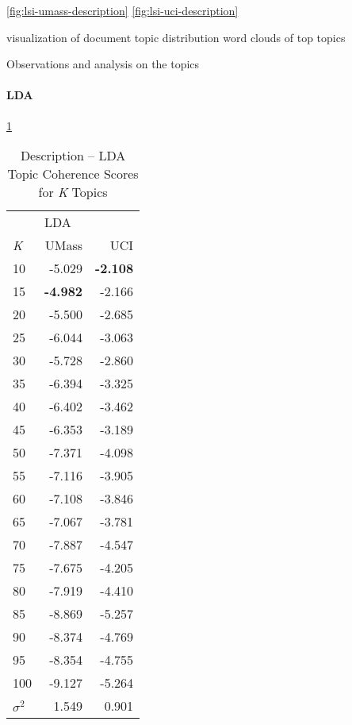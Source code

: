 \documentclass[letterpaper,12pt]{article}
\begin{document}
\ref{fig:lsi-umass-description}
\ref{fig:lsi-uci-description}


\newpage
visualization of document topic distribution
word clouds of top topics

Observations and analysis on the topics

\paragraph{LDA}

\ref{tab:lda_description_tc}
\begin{table}
	\caption{\label{tab:lda_description_tc} Description -- LDA Topic Coherence Scores for \emph{K} Topics}
	\begin{center}
		\begin{tabular}{lrr}
			\toprule
			{} & \multicolumn{2}{l}{LDA} \\
			\emph{K} &  UMass &    UCI \\
			\midrule
			10  & -5.029 & \textbf{-2.108} \\
			15  & \textbf{-4.982} & -2.166 \\
			20  & -5.500 & -2.685 \\
			25  & -6.044 & -3.063 \\
			30  & -5.728 & -2.860 \\
			35  & -6.394 & -3.325 \\
			40  & -6.402 & -3.462 \\
			45  & -6.353 & -3.189 \\
			50  & -7.371 & -4.098 \\
			55  & -7.116 & -3.905 \\
			60  & -7.108 & -3.846 \\
			65  & -7.067 & -3.781 \\
			70  & -7.887 & -4.547 \\
			75  & -7.675 & -4.205 \\
			80  & -7.919 & -4.410 \\
			85  & -8.869 & -5.257 \\
			90  & -8.374 & -4.769 \\
			95  & -8.354 & -4.755 \\
			100 & -9.127 & -5.264 \\
			\midrule
			$\sigma^2$ & 1.549 & 0.901 \\
			\bottomrule
			\end{tabular}
	\end{center}
\end{table}
\end{document}
